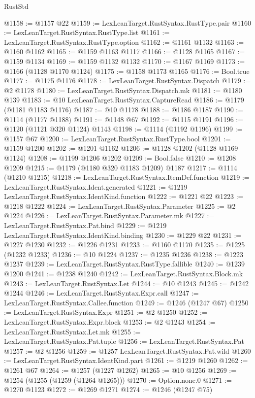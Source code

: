 \begin{lexlean}{RustStd}
\begin{coremodule}
@1158 := @1157 @22
@1159 := LexLeanTarget.RustSyntax.RustType.pair
@1160 := LexLeanTarget.RustSyntax.RustType.list
@1161 := LexLeanTarget.RustSyntax.RustType.option
@1162 := @1161 @1132
@1163 := @1160 @1162
@1165 := @1159 @1163 @1117
@1166 := @1128 @1165
@1167 := @1159 @1134
@1169 := @1159 @1132 @1132
@1170 := @1167 @1169
@1173 := @1166 (@1128 @1170 @1124)
@1175 := @1158 @1173 @1165
@1176 := Bool.true
@1177 := @1175 @1176
@1178 := LexLeanTarget.RustSyntax.Dispatch
@1179 := @2 @1178
@1180 := LexLeanTarget.RustSyntax.Dispatch.mk
@1181 := @1180 @139
@1183 := @10 LexLeanTarget.RustSyntax.CaptureRead
@1186 := @1179 (@1181 @1183 @1176)
@1187 := @10 @1178
@1188 := @1186 @1187
@1190 := @1114 (@1177 @1188)
@1191 := @1148 @67
@1192 := @1115 @1191
@1196 := @1120 (@1121 @320 @1124) @1143
@1198 := @1114 (@1192 @1196)
@1199 := @1157 @67
@1200 := LexLeanTarget.RustSyntax.RustType.bool
@1201 := @1159 @1200
@1202 := @1201 @1162
@1206 := @1128 @1202 (@1128 @1169 @1124)
@1208 := @1199 @1206 @1202
@1209 := Bool.false
@1210 := @1208 @1209
@1215 := @1179 (@1180 @320 @1183 @1209) @1187
@1217 := @1114 (@1210 @1215)
@1218 := LexLeanTarget.RustSyntax.ItemDef.function
@1219 := LexLeanTarget.RustSyntax.Ident.generated
@1221 := @1219 LexLeanTarget.RustSyntax.IdentKind.function
@1222 := @1221 @22
@1223 := @1218 @1222
@1224 := LexLeanTarget.RustSyntax.Parameter
@1225 := @2 @1224
@1226 := LexLeanTarget.RustSyntax.Parameter.mk
@1227 := LexLeanTarget.RustSyntax.Pat.bind
@1229 := @1219 LexLeanTarget.RustSyntax.IdentKind.binding
@1230 := @1229 @22
@1231 := @1227 @1230
@1232 := @1226 @1231
@1233 := @1160 @1170
@1235 := @1225 (@1232 @1233)
@1236 := @10 @1224
@1237 := @1235 @1236
@1238 := @1223 @1237
@1239 := LexLeanTarget.RustSyntax.RustType.fallible
@1240 := @1239 @1200
@1241 := @1238 @1240
@1242 := LexLeanTarget.RustSyntax.Block.mk
@1243 := LexLeanTarget.RustSyntax.Let
@1244 := @10 @1243
@1245 := @1242 @1244
@1246 := LexLeanTarget.RustSyntax.Expr.call
@1247 := LexLeanTarget.RustSyntax.Callee.function
@1249 := @1246 (@1247 @67)
@1250 := LexLeanTarget.RustSyntax.Expr
@1251 := @2 @1250
@1252 := LexLeanTarget.RustSyntax.Expr.block
@1253 := @2 @1243
@1254 := LexLeanTarget.RustSyntax.Let.mk
@1255 := LexLeanTarget.RustSyntax.Pat.tuple
@1256 := LexLeanTarget.RustSyntax.Pat
@1257 := @2 @1256
@1259 := @1257 LexLeanTarget.RustSyntax.Pat.wild
@1260 := LexLeanTarget.RustSyntax.IdentKind.part
@1261 := @1219 @1260
@1262 := @1261 @67
@1264 := @1257 (@1227 @1262)
@1265 := @10 @1256
@1269 := @1254 (@1255 (@1259 (@1264 @1265)))
@1270 := Option.none.{0}
@1271 := @1270 @1123
@1272 := @1269 @1271
@1274 := @1246 (@1247 @75)

\end{coremodule}
\end{lexlean}
